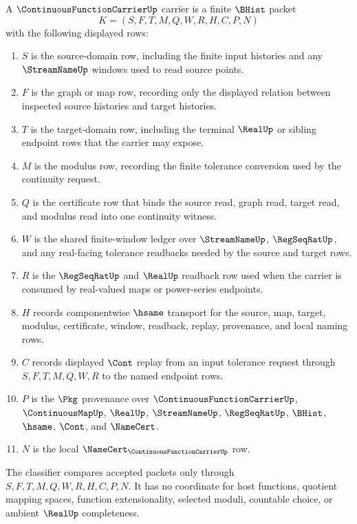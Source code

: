 \begin{definition}\label{def:continuous-function-carrier-carrier}
A $\ContinuousFunctionCarrierUp$ carrier is a finite $\BHist$ packet
$$
K=(S,F,T,M,Q,W,R,H,C,P,N)
$$
with the following displayed rows:
\begin{enumerate}
\item $S$ is the source-domain row, including the finite input histories and any $\StreamNameUp$ windows used to read source points.
\item $F$ is the graph or map row, recording only the displayed relation between inspected source histories and target histories.
\item $T$ is the target-domain row, including the terminal $\RealUp$ or sibling endpoint rows that the carrier may expose.
\item $M$ is the modulus row, recording the finite tolerance conversion used by the continuity request.
\item $Q$ is the certificate row that binds the source read, graph read, target read, and modulus read into one continuity witness.
\item $W$ is the shared finite-window ledger over $\StreamNameUp$, $\RegSeqRatUp$, and any real-facing tolerance readbacks needed by the source and target rows.
\item $R$ is the $\RegSeqRatUp$ and $\RealUp$ readback row used when the carrier is consumed by real-valued maps or power-series endpoints.
\item $H$ records componentwise $\hsame$ transport for the source, map, target, modulus, certificate, window, readback, replay, provenance, and local naming rows.
\item $C$ records displayed $\Cont$ replay from an input tolerance request through $S,F,T,M,Q,W,R$ to the named endpoint rows.
\item $P$ is the $\Pkg$ provenance over $\ContinuousFunctionCarrierUp$, $\ContinuousMapUp$, $\RealUp$, $\StreamNameUp$, $\RegSeqRatUp$, $\BHist$, $\hsame$, $\Cont$, and $\NameCert$.
\item $N$ is the local $\NameCert_{\ContinuousFunctionCarrierUp}$ row.
\end{enumerate}
The classifier compares accepted packets only through $S,F,T,M,Q,W,R,H,C,P,N$. It has no coordinate for host functions, quotient mapping spaces, function extensionality, selected moduli, countable choice, or ambient $\RealUp$ completeness.
\end{definition}

